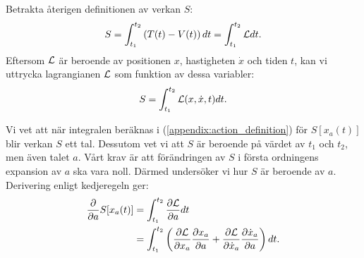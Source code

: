     Betrakta återigen definitionen av verkan $S$:
    \begin{equation}
        S = \int_{t_1}^{t_2}\left(T(t)-V(t)\right)dt = \int_{t_1}^{t_2}\mathcal{L} dt.
    \end{equation}
    Eftersom $\mathcal{L}$ är beroende av positionen $x$, hastigheten $\dot{x}$ och tiden $t$, kan vi uttrycka lagrangianen $\mathcal{L}$ som funktion av dessa variabler:
    \begin{equation}
        S = \int_{t_1}^{t_2} \mathcal{L}(x,\dot{x},t) dt.\label{appendix:action_definition}
    \end{equation}

    Vi vet att när integralen beräknas i (\ref{appendix:action_definition}) för $S[x_a(t)]$ blir verkan $S$ ett tal. Dessutom vet vi att $S$ är beroende på värdet av $t_1$ och $t_2$, men även talet $a$. Vårt krav är att förändringen av $S$ i första ordningens expansion av $a$ ska vara noll. Därmed undersöker vi hur $S$ är beroende av $a$. Derivering enligt kedjeregeln ger:
    \begin{align}
        \frac{\partial}{\partial a} S[x_a(t)] &= \int_{t_1}^{t_2} \frac{\partial \mathcal{L}}{\partial a} dt \notag \\
        &= \int_{t_1}^{t_2} \left( \frac{\partial \mathcal{L}}{\partial x_a} \frac{\partial x_a}{\partial a} + \frac{\partial \mathcal{L}}{\partial \dot{x}_a} \frac{\partial \dot{x}_a}{\partial a}\right) dt. \label{appendix:after_chainrule}
    \end{align}

